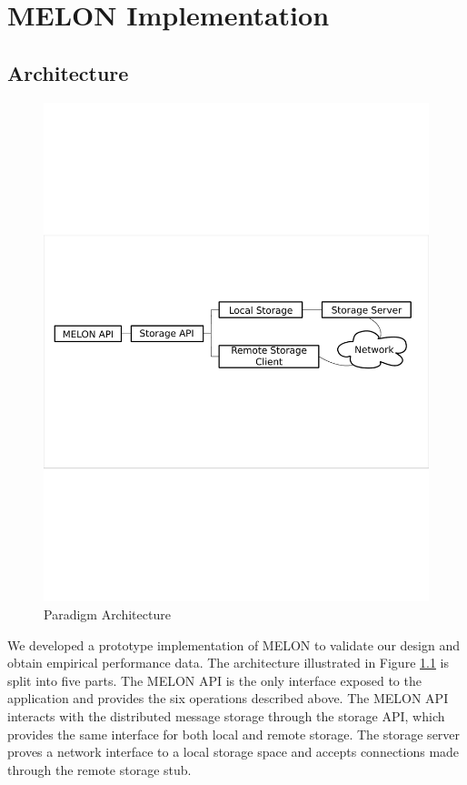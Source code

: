 \chapter{MELON Implementation}\label{chapter:implementation}

\section{Architecture}

\begin{figure}
\centering
\includegraphics[scale = .70, clip, trim = 10px 280px 10px 250px]{figures/paradigm_arch.pdf}
\caption{Paradigm Architecture}
\label{fig:architecture}
\end{figure}

We developed a prototype implementation of MELON to validate our design and obtain empirical performance data. The architecture illustrated in Figure \ref{fig:architecture} is split into five parts. The MELON API is the only interface exposed to the application and provides the six operations described above. The MELON API interacts with the distributed message storage through the storage API, which provides the same interface for both local and remote storage. The storage server proves a network interface to a local storage space and accepts connections made through the remote storage stub.


